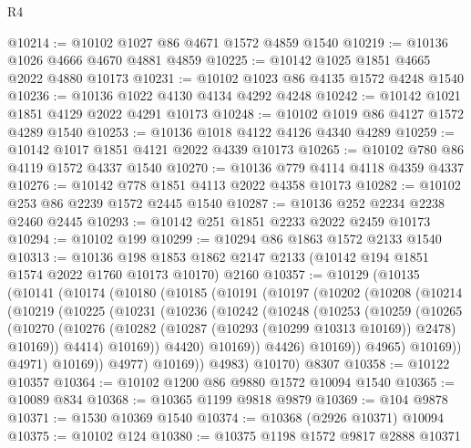 \begin{lexlean}{R4}
\begin{coremodule}
@10214 := @10102 @1027 @86 @4671 @1572 @4859 @1540
@10219 := @10136 @1026 @4666 @4670 @4881 @4859
@10225 := @10142 @1025 @1851 @4665 @2022 @4880 @10173
@10231 := @10102 @1023 @86 @4135 @1572 @4248 @1540
@10236 := @10136 @1022 @4130 @4134 @4292 @4248
@10242 := @10142 @1021 @1851 @4129 @2022 @4291 @10173
@10248 := @10102 @1019 @86 @4127 @1572 @4289 @1540
@10253 := @10136 @1018 @4122 @4126 @4340 @4289
@10259 := @10142 @1017 @1851 @4121 @2022 @4339 @10173
@10265 := @10102 @780 @86 @4119 @1572 @4337 @1540
@10270 := @10136 @779 @4114 @4118 @4359 @4337
@10276 := @10142 @778 @1851 @4113 @2022 @4358 @10173
@10282 := @10102 @253 @86 @2239 @1572 @2445 @1540
@10287 := @10136 @252 @2234 @2238 @2460 @2445
@10293 := @10142 @251 @1851 @2233 @2022 @2459 @10173
@10294 := @10102 @199
@10299 := @10294 @86 @1863 @1572 @2133 @1540
@10313 := @10136
    @198
    @1853
    @1862
    @2147
    @2133
    (@10142 @194 @1851 @1574 @2022 @1760 @10173 @10170)
    @2160
@10357 := @10129
    (@10135
      (@10141
        (@10174
          (@10180
            (@10185
              (@10191
                (@10197
                  (@10202
                    (@10208
                      (@10214
                        (@10219
                          (@10225
                            (@10231
                              (@10236
                                (@10242
                                  (@10248
                                    (@10253
                                      (@10259
                                        (@10265
                                          (@10270
                                            (@10276
                                              (@10282
                                                (@10287 (@10293 (@10299 @10313 @10169)) @2478)
                                                @10169))
                                            @4414)
                                          @10169))
                                      @4420)
                                    @10169))
                                @4426)
                              @10169))
                          @4965)
                        @10169))
                    @4971)
                  @10169))
              @4977)
            @10169))
        @4983)
      @10170)
    @8307
@10358 := @10122 @10357
@10364 := @10102 @1200 @86 @9880 @1572 @10094 @1540
@10365 := @10089 @834
@10368 := @10365 @1199 @9818 @9879
@10369 := @104 @9878
@10371 := @1530 @10369 @1540
@10374 := @10368 (@2926 @10371) @10094
@10375 := @10102 @124
@10380 := @10375 @1198 @1572 @9817 @2888 @10371

\end{coremodule}
\end{lexlean}
